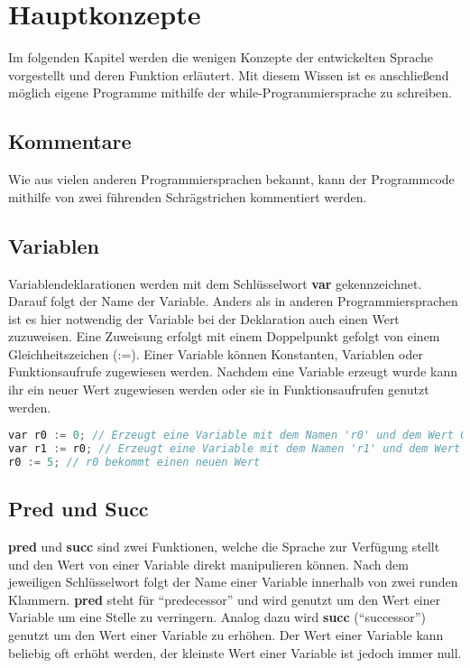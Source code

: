 \section{Hauptkonzepte}
Im folgenden Kapitel werden die wenigen Konzepte der entwickelten Sprache vorgestellt und deren Funktion erläutert. Mit diesem Wissen ist es anschließend möglich eigene Programme mithilfe der while-Programmiersprache zu schreiben.

\subsection{Kommentare}
Wie aus vielen anderen Programmiersprachen bekannt, kann der Programmcode mithilfe von zwei führenden Schrägstrichen  kommentiert werden.

\subsection{Variablen}
Variablendeklarationen werden mit dem Schlüsselwort \textbf{var} gekennzeichnet. Darauf folgt der Name der Variable. Anders als in anderen Programmiersprachen ist es hier notwendig der Variable bei der Deklaration auch einen Wert zuzuweisen. Eine Zuweisung erfolgt mit einem Doppelpunkt gefolgt von einem Gleichheitszeichen (:=). Einer Variable können Konstanten, Variablen oder Funktionsaufrufe zugewiesen werden. Nachdem eine Variable erzeugt wurde kann ihr ein neuer Wert zugewiesen werden oder sie in Funktionsaufrufen genutzt werden.

\begin{lstlisting}[language=c, caption=Variablennutzung in While, label={lst:while-var-defdec}]
var r0 := 0; // Erzeugt eine Variable mit dem Namen 'r0' und dem Wert 0
var r1 := r0; // Erzeugt eine Variable mit dem Namen 'r1' und dem Wert von r0
r0 := 5; // r0 bekommt einen neuen Wert
\end{lstlisting}

\subsection{Pred und Succ}
\textbf{pred} und \textbf{succ} sind zwei Funktionen, welche die Sprache zur Verfügung stellt und den Wert von einer Variable direkt manipulieren können. Nach dem jeweiligen Schlüsselwort folgt der Name einer Variable innerhalb von zwei runden Klammern. \textbf{pred} steht für \enquote{predecessor} und wird genutzt um den Wert einer Variable um eine Stelle zu verringern. Analog dazu wird \textbf{succ} (\enquote{successor}) genutzt um den Wert einer Variable zu erhöhen. Der Wert einer Variable kann beliebig oft erhöht werden, der kleinste Wert einer Variable ist jedoch immer null.

